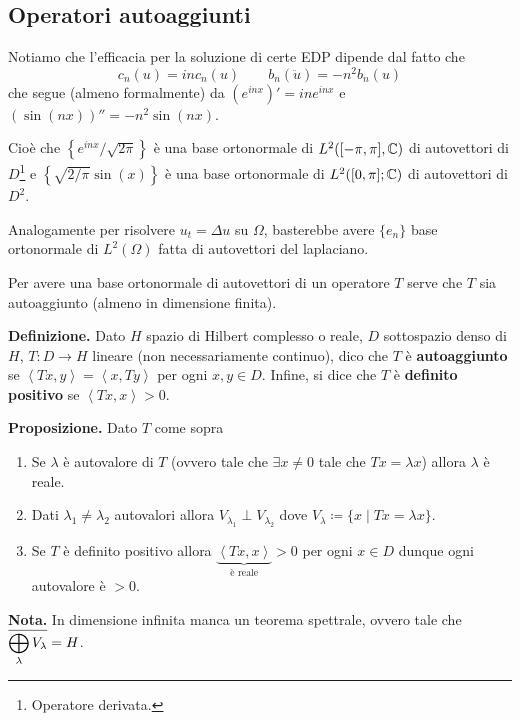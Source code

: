\subsection{Operatori autoaggiunti}

Notiamo che l'efficacia per la soluzione di certe EDP dipende dal fatto che
%
$$
	c_n(u) = in c_n(u) \qquad b_n(\ddot u) = -n^2 b_n(u)
$$
%
che segue (almeno formalmente) da $(e^{inx})' = in e^{inx}$ e $(\sin(nx))'' = -n^2 \sin(nx)$.

Cioè che $\left\{ e^{inx} / \sqrt{2\pi} \right\}$ è una base ortonormale di $L^2([-\pi,\pi],\mathbb C)$ di autovettori di $D$\footnote{Operatore derivata.} e $\left\{ \sqrt{2/\pi} \sin(x)  \right\}$ è una base ortonormale di $L^2([0,\pi];\mathbb C)$ di autovettori di $D^2$.

Analogamente per risolvere $u_t = \Delta u$ su $\Omega$, basterebbe avere $\{ e_n \}$ base ortonormale di $L^2(\Omega)$ fatta di autovettori del laplaciano.

Per avere una base ortonormale di autovettori di un operatore $T$ serve che $T$ sia autoaggiunto (almeno in dimensione finita).

\textbf{Definizione.} Dato $H$ spazio di Hilbert complesso o reale, $D$ sottospazio denso di $H$, $T \colon D \to H$ lineare (non necessariamente continuo), dico che $T$ è \textbf{autoaggiunto} se $\left<Tx,y \right> = \left<x,Ty \right>$ per ogni $x,y \in D$.
Infine, si dice che $T$ è \textbf{definito positivo} se $\left<Tx,x \right> > 0$.

\textbf{Proposizione.} Dato $T$ come sopra
\begin{enumerate}

	\item Se $\lambda$ è autovalore di $T$ (ovvero tale che $\exists x \neq 0$ tale che $Tx = \lambda x$) allora $\lambda$ è reale.

	\item Dati $\lambda_1 \neq \lambda_2$ autovalori allora $V_{\lambda_1} \perp V_{\lambda_2}$ dove $V_\lambda \coloneqq \{ x \mid Tx = \lambda x \}$.

	\item Se $T$ è definito positivo allora $\underbrace{\left<Tx,x \right>}_{\text{è reale}} > 0$ per ogni $x \in D$ dunque ogni autovalore è $> 0$.

\end{enumerate}

\textbf{Nota.} In dimensione infinita manca un teorema spettrale, ovvero tale che $\displaystyle \overline{\bigoplus_\lambda V_\lambda} = H$.


